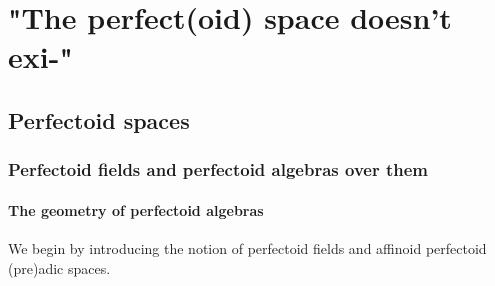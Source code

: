     \section{"The perfect(oid) space doesn't exi-"}
        \subsection{Perfectoid spaces}
            \subsubsection{Perfectoid fields and perfectoid algebras over them}
                \paragraph{The geometry of perfectoid algebras}
                    We begin by introducing the notion of perfectoid fields and affinoid perfectoid (pre)adic spaces.
                
